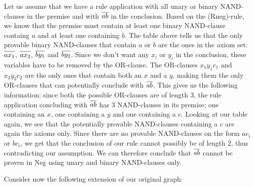 Let us assume that we have a rule application with all unary or binary NAND-clauses in the premise and with $\ol{ab}$ in the conclusion.
Based on the (Rneg)-rule, we know that the premise must contain at least one binary NAND-clause containg $a$ and at least one containing $b$.
The table above tells us that the only provable binary NAND-clauses that contain $a$ or $b$ are the ones in the axiom set:
$\ol{ax_1}$, $\ol{ax_2}$, $\ol{by_1}$ and $\ol{by_2}$.
Since we don't want any $x_i$ or $y_i$ in the conclusion, these variables have to be removed by the OR-clause.
The OR-clauses $x_1y_1c_1$ and $x_2y_2c_2$ are the only ones that contain both an $x$ and a $y$, making them the only OR-clauses that can potentially conclude with $\ol{ab}$.
This gives us the following information: since both the possible OR-clauses are of length 3, the rule application concluding with $\ol{ab}$ has 3 NAND-clauses in its premise; one containing an $x$, one containing a $y$ and one containing a $c$.
Looking at our table again, we see that the potentially provable NAND-clauses containing a $c$ are again the axioms only.
Since there are no provable NAND-clauses on the form $ac_i$ or $bc_i$, we get that the conclusion of our rule cannot possibly be of length 2, thus contradicting our assumption.
We can therefore conclude that $\ol{ab}$ cannot be proven in Neg using unary and binary NAND-clauses only.

Consider now the following extension of our original graph:

